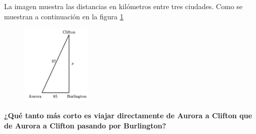 \question[15]  La imagen muestra las distancias en kilómetros entre tres ciudades.
Como se muestran a continuación en la figura \ref{fig:proverb_pitagoras_04}
\begin{figure}[H]
    \begin{center}
        \includegraphics[width=0.3\textwidth]{../images/proverb_pitagoras_04.png}
    \end{center}
    \caption{}
    \label{fig:proverb_pitagoras_04}
\end{figure}
\textbf{¿Qué tanto más corto es viajar directamente de Aurora a Clifton que de Aurora a Clifton pasando por Burlington?}